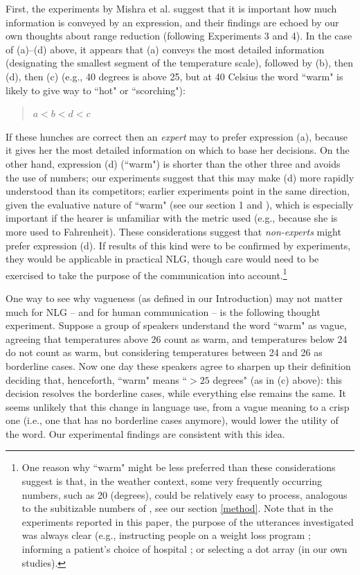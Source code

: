 \documentclass[%
man,		%
floatsintext,%
apacite%
]{apa6}
\begin{document}
First, the experiments by Mishra et al. suggest that it is important how much information is conveyed by an expression, and their findings are echoed by our own thoughts about range reduction (following Experiments 3 and 4). In the case of (a)--(d) above, it appears that (a) conveys the most detailed information (designating the smallest segment of the temperature scale), followed by (b), then (d), then (c) (e.g., 40 degrees is above 25, but at 40 Celsius the word ``warm" is likely to give way to ``hot" or ``scorching"): 
%
\begin{quote}
$a < b < d < c$
\end{quote}
%
If these hunches are correct then an {\em expert} may  to prefer expression (a), because it gives her the most detailed information on which to base her decisions. On the other hand, expression (d) (``warm") is shorter than the other three and avoids the use of numbers; our experiments suggest that this may make (d) more rapidly understood than its competitors; earlier experiments point in the same direction, given the evaluative nature of ``warm" (see our section 1 and  \cite{peters2009bringing}), which is especially important if the hearer is unfamiliar with the metric used (e.g., because she is more used to Fahrenheit). These considerations suggest that {\em non-experts} might prefer expression (d). If results of this kind were to be confirmed by experiments, they would be applicable in practical NLG, though care would need to be exercised to take the purpose of the communication into account.\footnote{One reason why ``warm" might be less preferred than these considerations suggest is that, in the weather context, some very frequently occurring numbers, such as 20 (degrees), could be relatively easy to process, analogous to the subitizable numbers of \protect\cite{trick1994small}, see our section \ref{method}. Note that in the experiments reported in this paper, the purpose of the utterances investigated was always clear (e.g., instructing people on a weight loss program \cite{Mishra01042011}; informing a patient's choice of hospital \cite{peters2009bringing}; or selecting a dot array (in our own studies).} 

One way to see why vagueness (as defined in our Introduction) may not matter much for NLG -- and for human communication -- is the following thought experiment. Suppose a group of speakers understand the word ``warm" as vague, agreeing that temperatures above 26 count as warm, and temperatures below 24 do not count as warm, but considering temperatures between 24 and 26 as borderline cases. Now one day these speakers agree to sharpen up their definition deciding that, henceforth, ``warm" means ``$>25$ degrees" (as in (c) above): this decision resolves the borderline cases, while everything else remains the same. It seems unlikely that this change in language use, from a vague meaning to a crisp one (i.e., one that has no borderline cases anymore), would lower the utility of the word. Our experimental findings are consistent with this idea.
\end{document}
